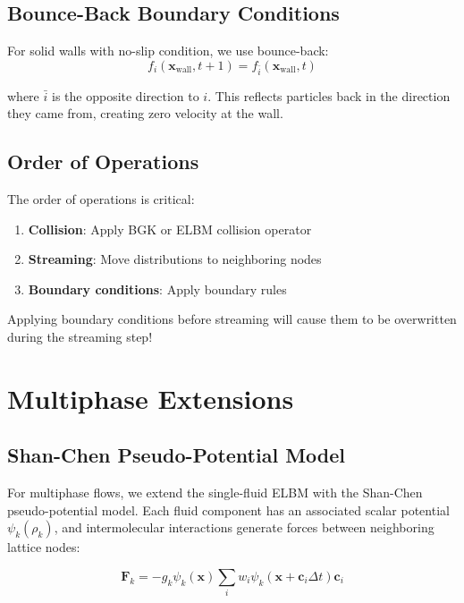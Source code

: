 \subsection{Bounce-Back Boundary Conditions}

For solid walls with no-slip condition, we use bounce-back:
\begin{equation}
f_i(\mathbf{x}_{\mathrm{wall}}, t+1) = f_{\bar{i}}(\mathbf{x}_{\mathrm{wall}}, t)
\end{equation}

where $\bar{i}$ is the opposite direction to $i$. This reflects particles back in the direction they came from, creating zero velocity at the wall.

\subsection{Order of Operations}

The order of operations is critical:
\begin{enumerate}
    \item \textbf{Collision}: Apply BGK or ELBM collision operator
    \item \textbf{Streaming}: Move distributions to neighboring nodes
    \item \textbf{Boundary conditions}: Apply boundary rules
\end{enumerate}

Applying boundary conditions before streaming will cause them to be overwritten during the streaming step!

\section{Multiphase Extensions}

\subsection{Shan-Chen Pseudo-Potential Model}

For multiphase flows, we extend the single-fluid ELBM with the Shan-Chen pseudo-potential model. Each fluid component has an associated scalar potential $\psi_k(\rho_k)$, and intermolecular interactions generate forces between neighboring lattice nodes:

\begin{equation}
\mathbf{F}_k = -g_k \psi_k(\mathbf{x}) \sum_i w_i \psi_k(\mathbf{x} + \mathbf{c}_i \Delta t) \mathbf{c}_i
\end{equation}

